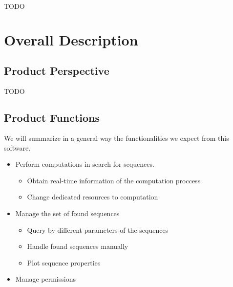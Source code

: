 \documentclass{scrreprt}
\begin{document}
TODO\\



\chapter{Overall Description}

\section{Product Perspective}

TODO\\


\section{Product Functions}

We will summarize in a general way the functionalities we expect from
this software.

\begin{itemize}
  \item Perform computations in search for sequences.\\
          \begin{itemize}
            \item Obtain real-time information of the computation proccess
            \item Change dedicated resources to computation
          \end{itemize}
  \item Manage the set of found sequences
          \begin{itemize}
            \item Query by different parameters of the sequences
            \item Handle found sequences manually
            \item Plot sequence properties
          \end{itemize}
  \item Manage permissions
\end{itemize}
\end{document}
